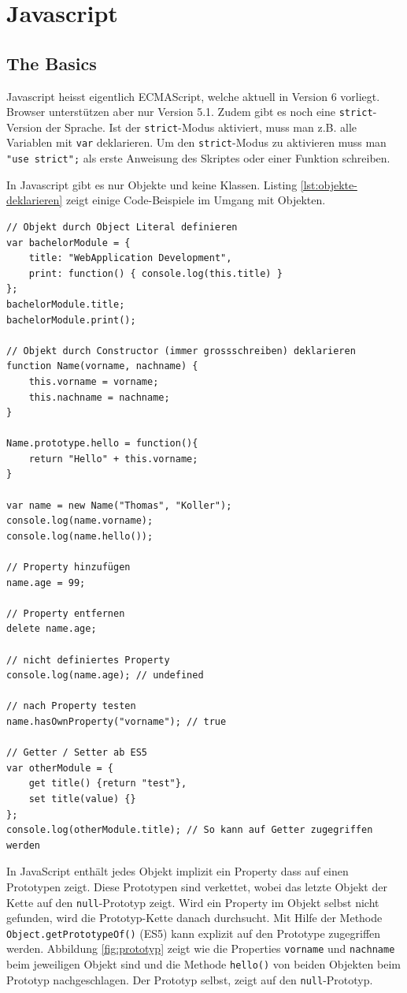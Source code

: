 \chapter{Javascript}

\section{The Basics}

Javascript heisst eigentlich ECMAScript, welche aktuell in Version 6 vorliegt. Browser unterstützen aber nur Version 5.1. Zudem gibt es noch eine \lstinline|strict|-Version der Sprache. Ist der \lstinline|strict|-Modus aktiviert, muss man z.B. alle Variablen mit \lstinline|var| deklarieren. Um den \lstinline|strict|-Modus zu aktivieren muss man \lstinline|"use strict";| als erste Anweisung des Skriptes oder einer Funktion schreiben.

In Javascript gibt es nur Objekte und keine Klassen. Listing \ref{lst:objekte-deklarieren} zeigt einige Code-Beispiele im Umgang mit Objekten.

\begin{lstlisting}[label=lst:objekte-deklarieren,caption=Objekte deklarieren]
// Objekt durch Object Literal definieren
var bachelorModule = {
	title: "WebApplication Development",
	print: function() { console.log(this.title) }
};
bachelorModule.title;
bachelorModule.print();

// Objekt durch Constructor (immer grossschreiben) deklarieren
function Name(vorname, nachname) {
	this.vorname = vorname;
	this.nachname = nachname;
}

Name.prototype.hello = function(){
	return "Hello" + this.vorname;
}

var name = new Name("Thomas", "Koller");
console.log(name.vorname);
console.log(name.hello());

// Property hinzufügen
name.age = 99;

// Property entfernen
delete name.age;

// nicht definiertes Property
console.log(name.age); // undefined

// nach Property testen
name.hasOwnProperty("vorname"); // true

// Getter / Setter ab ES5
var otherModule = {
	get title() {return "test"},
	set title(value) {}
};
console.log(otherModule.title); // So kann auf Getter zugegriffen werden
\end{lstlisting}

In JavaScript enthält jedes Objekt implizit ein Property dass auf einen Prototypen zeigt. Diese Prototypen sind verkettet, wobei das letzte Objekt der Kette auf den \lstinline|null|-Prototyp zeigt. Wird ein Property im Objekt selbst nicht gefunden, wird die Prototyp-Kette danach durchsucht. Mit Hilfe der Methode \lstinline|Object.getPrototypeOf()| (ES5) kann explizit auf den Prototype zugegriffen werden. Abbildung \ref{fig:prototyp} zeigt wie die Properties \lstinline|vorname| und \lstinline|nachname| beim jeweiligen Objekt sind und die Methode \lstinline|hello()| von beiden Objekten beim Prototyp nachgeschlagen. Der Prototyp selbst, zeigt auf den \lstinline|null|-Prototyp.

